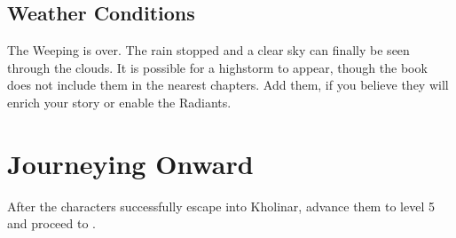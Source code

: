 \subsection{Weather Conditions}

The Weeping is over. The rain stopped and a clear sky can finally be seen through the clouds. It is possible for a highstorm to appear, though the book does not include them in the nearest chapters. Add them, if you believe they will enrich your story or enable the Radiants.






\section{Journeying Onward}

After the characters successfully escape into Kholinar, advance them to level 5 and proceed to .